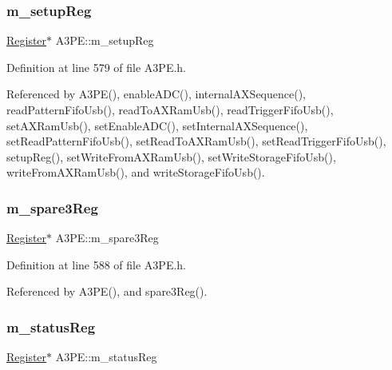 \subsubsection{\texorpdfstring{m\+\_\+setup\+Reg}{m\_setupReg}}
{\footnotesize\ttfamily \hyperlink{classRegister}{Register}$\ast$ A3\+P\+E\+::m\+\_\+setup\+Reg\hspace{0.3cm}{\ttfamily [private]}}



Definition at line 579 of file A3\+P\+E.\+h.



Referenced by A3\+P\+E(), enable\+A\+D\+C(), internal\+A\+X\+Sequence(), read\+Pattern\+Fifo\+Usb(), read\+To\+A\+X\+Ram\+Usb(), read\+Trigger\+Fifo\+Usb(), set\+A\+X\+Ram\+Usb(), set\+Enable\+A\+D\+C(), set\+Internal\+A\+X\+Sequence(), set\+Read\+Pattern\+Fifo\+Usb(), set\+Read\+To\+A\+X\+Ram\+Usb(), set\+Read\+Trigger\+Fifo\+Usb(), setup\+Reg(), set\+Write\+From\+A\+X\+Ram\+Usb(), set\+Write\+Storage\+Fifo\+Usb(), write\+From\+A\+X\+Ram\+Usb(), and write\+Storage\+Fifo\+Usb().

\mbox{\label{classA3PE_a1e7e5c89f190672990ae5bece2a8b1aa}} 
\subsubsection{\texorpdfstring{m\+\_\+spare3\+Reg}{m\_spare3Reg}}
{\footnotesize\ttfamily \hyperlink{classRegister}{Register}$\ast$ A3\+P\+E\+::m\+\_\+spare3\+Reg\hspace{0.3cm}{\ttfamily [private]}}



Definition at line 588 of file A3\+P\+E.\+h.



Referenced by A3\+P\+E(), and spare3\+Reg().

\mbox{\label{classA3PE_a2281e3d12a2dffad99ec55be2b695f53}} 
\subsubsection{\texorpdfstring{m\+\_\+status\+Reg}{m\_statusReg}}
{\footnotesize\ttfamily \hyperlink{classRegister}{Register}$\ast$ A3\+P\+E\+::m\+\_\+status\+Reg\hspace{0.3cm}{\ttfamily [private]}}




